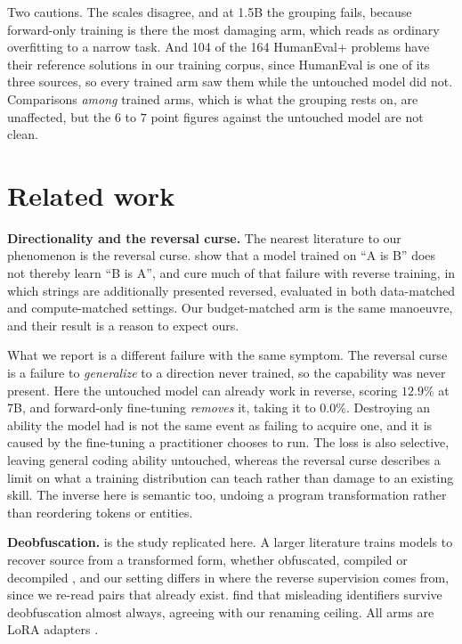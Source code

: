 \documentclass{article}
\begin{document}
Two cautions. The scales disagree, and at 1.5B the grouping fails, because forward-only
training is there the most damaging arm, which reads as ordinary overfitting to a narrow task.
And 104 of the 164 HumanEval+ problems have their reference solutions in our training corpus,
since HumanEval is one of its three sources, so every trained arm saw them while the untouched
model did not. Comparisons \emph{among} trained arms, which is what the grouping rests on, are
unaffected, but the $6$ to $7$ point figures against the untouched model are not clean.

\section{Related work}

\textbf{Directionality and the reversal curse.} The nearest literature to our phenomenon is
the reversal curse. \citet{berglund2024reversal} show that a model trained on ``A is B'' does
not thereby learn ``B is A'', and \citet{golovneva2024reverse} cure much of that failure with
reverse training, in which strings are additionally presented reversed, evaluated in both
data-matched and compute-matched settings. Our budget-matched arm is the same manoeuvre, and
their result is a reason to expect ours.

What we report is a different failure with the same symptom. The reversal curse is a failure to
\emph{generalize} to a direction never trained, so the capability was never present. Here the
untouched model can already work in reverse, scoring $12.9\%$ at 7B, and forward-only
fine-tuning \emph{removes} it, taking it to $0.0\%$. Destroying an ability the model had is not
the same event as failing to acquire one, and it is caused by the fine-tuning a practitioner
chooses to run. The loss is also selective, leaving general coding ability untouched, whereas
the reversal curse describes a limit on what a training distribution can teach rather than
damage to an existing skill. The inverse here is semantic too, undoing a program
transformation rather than reordering tokens or entities.

\textbf{Deobfuscation.} \citet{nikiema2025contrastive} is the study replicated here. A larger
literature trains models to recover source from a transformed form, whether obfuscated,
compiled or decompiled \citep{roziere2021dobf,tan2024llm4decompile,hu2026bindeobf}, and our
setting differs in where the reverse supervision comes from, since we re-read pairs that
already exist. \citet{guzman2026poisoned} find that misleading identifiers survive
deobfuscation almost always, agreeing with our renaming ceiling. All arms are LoRA adapters
\citep{hu2022lora}.
\end{document}
